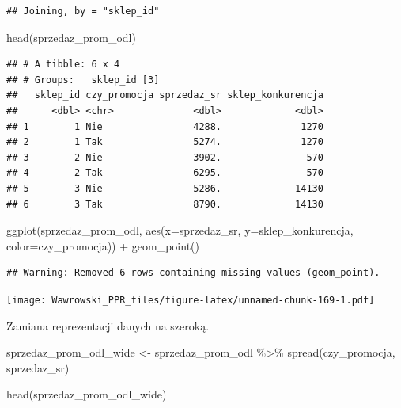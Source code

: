 \documentclass[
]{book}
\newenvironment{Shaded}{\begin{snugshade}}{\end{snugshade}}
\newcommand{\AttributeTok}[1]{\textcolor[rgb]{0.77,0.63,0.00}{#1}}
\newcommand{\FunctionTok}[1]{\textcolor[rgb]{0.00,0.00,0.00}{#1}}
\newcommand{\NormalTok}[1]{#1}
\newcommand{\OtherTok}[1]{\textcolor[rgb]{0.56,0.35,0.01}{#1}}
\newcommand{\SpecialCharTok}[1]{\textcolor[rgb]{0.00,0.00,0.00}{#1}}
\begin{document}
\begin{verbatim}
## Joining, by = "sklep_id"
\end{verbatim}

\begin{Shaded}
\begin{Highlighting}[]
\FunctionTok{head}\NormalTok{(sprzedaz\_prom\_odl)}
\end{Highlighting}
\end{Shaded}

\begin{verbatim}
## # A tibble: 6 x 4
## # Groups:   sklep_id [3]
##   sklep_id czy_promocja sprzedaz_sr sklep_konkurencja
##      <dbl> <chr>              <dbl>             <dbl>
## 1        1 Nie                4288.              1270
## 2        1 Tak                5274.              1270
## 3        2 Nie                3902.               570
## 4        2 Tak                6295.               570
## 5        3 Nie                5286.             14130
## 6        3 Tak                8790.             14130
\end{verbatim}

\begin{Shaded}
\begin{Highlighting}[]
\FunctionTok{ggplot}\NormalTok{(sprzedaz\_prom\_odl, }\FunctionTok{aes}\NormalTok{(}\AttributeTok{x=}\NormalTok{sprzedaz\_sr, }\AttributeTok{y=}\NormalTok{sklep\_konkurencja, }\AttributeTok{color=}\NormalTok{czy\_promocja)) }\SpecialCharTok{+} 
  \FunctionTok{geom\_point}\NormalTok{()}
\end{Highlighting}
\end{Shaded}

\begin{verbatim}
## Warning: Removed 6 rows containing missing values (geom_point).
\end{verbatim}

\texttt{[image: Wawrowski\_PPR\_files/figure-latex/unnamed-chunk-169-1.pdf]}

Zamiana reprezentacji danych na szeroką.

\begin{Shaded}
\begin{Highlighting}[]
\NormalTok{sprzedaz\_prom\_odl\_wide }\OtherTok{\textless{}{-}}\NormalTok{ sprzedaz\_prom\_odl }\SpecialCharTok{\%\textgreater{}\%}
  \FunctionTok{spread}\NormalTok{(czy\_promocja, sprzedaz\_sr)}

\FunctionTok{head}\NormalTok{(sprzedaz\_prom\_odl\_wide)}
\end{Highlighting}
\end{Shaded}
\end{document}
